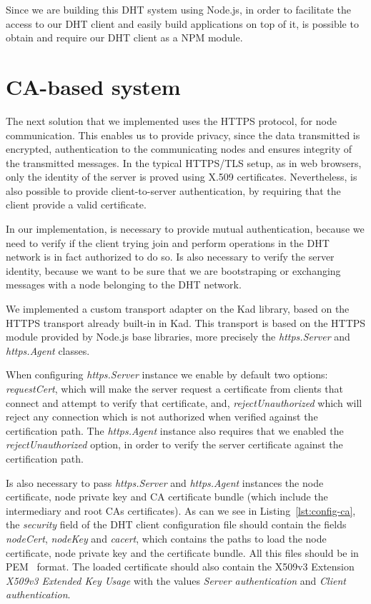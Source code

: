 Since we are building this DHT system using Node.js, in order to facilitate the access to our DHT client and easily build applications on top of it, is possible to obtain and require our DHT client as a \ac{NPM} module.

\section{CA-based system}

The next solution that we implemented uses the HTTPS protocol, for node communication.
This enables us to provide privacy, since the data transmitted is encrypted, authentication to the communicating nodes and ensures integrity of the transmitted messages.
In the typical HTTPS/TLS setup, as in web browsers, only the identity of the server is proved using X.509 certificates.
Nevertheless, is also possible to provide client-to-server authentication, by requiring that the client provide a valid certificate.

In our implementation, is necessary to provide mutual authentication, because we need to verify if the client trying join and perform operations in the DHT network is in fact authorized to do so.
Is also necessary to verify the server identity, because we want to be sure that we are bootstraping or exchanging messages with a node belonging to the DHT network.

We implemented a custom transport adapter on the Kad library, based on the HTTPS transport already built-in in Kad.
This transport is based on the HTTPS module provided by Node.js base libraries, more precisely the \textit{https.Server} and \textit{https.Agent} classes.

When configuring \textit{https.Server} instance we enable by default two options: \textit{requestCert}, which will make the server request a certificate from clients that connect and attempt to verify that certificate, and, \textit{rejectUnauthorized} which will reject any connection which is not authorized when verified against the certification path.
The \textit{https.Agent} instance also requires that we enabled the \textit{rejectUnauthorized} option, in order to verify the server certificate against the certification path.

Is also necessary to pass \textit{https.Server} and \textit{https.Agent} instances the node certificate, node private key and CA certificate bundle (which include the intermediary and root CAs certificates).
As can we see in Listing~\ref{lst:config-ca}, the \textit{security} field of the DHT client configuration file should contain the fields \textit{nodeCert}, \textit{nodeKey} and \textit{cacert}, which contains the paths to load the node certificate, node private key and the certificate bundle.
All this files should be in \ac{PEM}~\cite{rfc1421} format.
The loaded certificate should also contain the X509v3 Extension \textit{X509v3 Extended Key Usage} with the values \textit{Server authentication} and \textit{Client authentication}.

